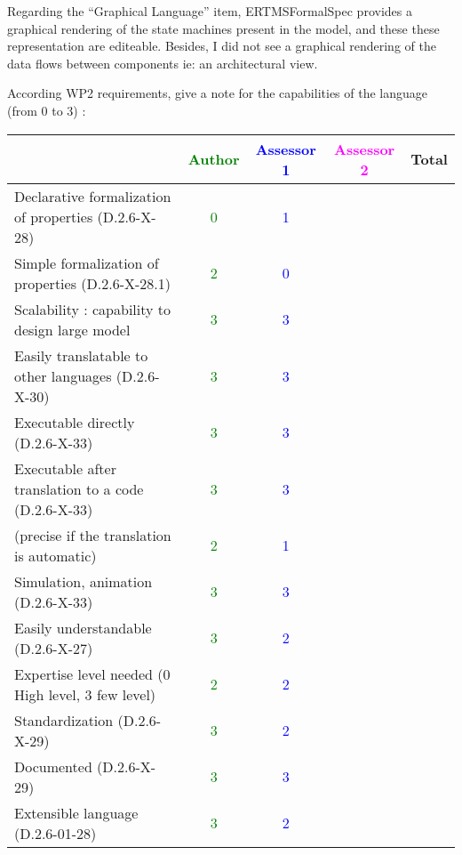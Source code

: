 \begin{assessor1}
Regarding the "`Graphical Language"' item, ERTMSFormalSpec provides a graphical rendering of the state machines present in the model, and these these representation are editeable. Besides, I did not see a graphical rendering of the data flows between components ie: an architectural view. 
\end{assessor1}

According WP2 requirements, give a note for the capabilities of the language (from 0 to 3) :

\begin{tabular}{|l | c | c | c | c|}
\hline
& \textcolor{green}{Author} & \textcolor{blue}{Assessor 1} & \textcolor{magenta}{Assessor 2} & Total \\
\hline
Declarative formalization of properties (D.2.6-X-28) & \textcolor{green}{0} & \textcolor{blue}{1} & & \\
\hline
Simple formalization of properties (D.2.6-X-28.1) & \textcolor{green}{2} & \textcolor{blue}{0} & & \\
\hline
Scalability : capability to design large model & \textcolor{green}{3} & \textcolor{blue}{3} & & \\
\hline
Easily translatable to other languages (D.2.6-X-30) & \textcolor{green}{3} & \textcolor{blue}{3} & & \\
\hline
Executable directly (D.2.6-X-33) & \textcolor{green}{3} & \textcolor{blue}{3} & & \\
\hline
Executable after translation to a code (D.2.6-X-33) & \textcolor{green}{3} & \textcolor{blue}{3} & & \\
(precise if the translation is automatic) & \textcolor{green}{2} & \textcolor{blue}{1} & & \\
\hline
Simulation, animation (D.2.6-X-33) & \textcolor{green}{3} & \textcolor{blue}{3} & & \\
\hline
Easily understandable (D.2.6-X-27) & \textcolor{green}{3} & \textcolor{blue}{2} & & \\
\hline
Expertise level needed (0 High level, 3 few level) & \textcolor{green}{2} & \textcolor{blue}{2} & & \\
\hline
Standardization (D.2.6-X-29) & \textcolor{green}{3} & \textcolor{blue}{2} & & \\
\hline
Documented (D.2.6-X-29) & \textcolor{green}{3} & \textcolor{blue}{3} & & \\
\hline
Extensible language (D.2.6-01-28) & \textcolor{green}{3} & \textcolor{blue}{2} & & \\
\hline
\end{tabular}


